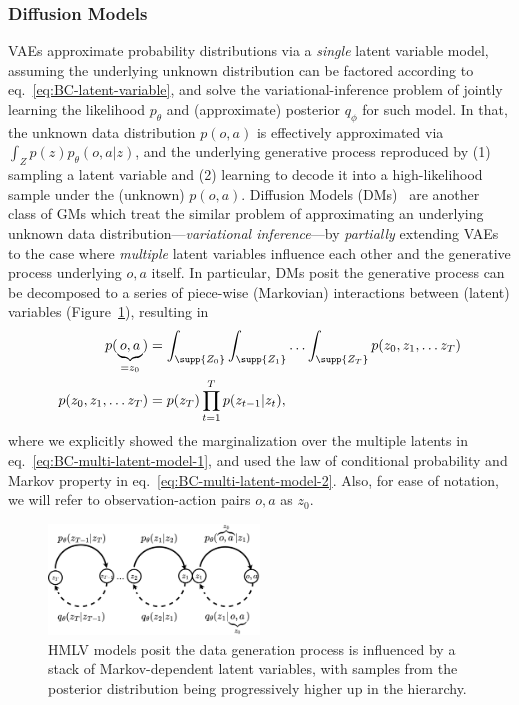 \subsubsection{Diffusion Models}
VAEs approximate probability distributions via a \emph{single} latent variable model, assuming the underlying unknown distribution can be factored according to eq.~\ref{eq:BC-latent-variable}, and solve the variational-inference problem of jointly learning the likelihood \( p_\theta \) and (approximate) posterior \( q_\phi \) for such model.
In that, the unknown data distribution \( p(o,a) \) is effectively approximated via \( \int_Z p(z) p_\theta(o,a \vert z) \), and the underlying generative process reproduced by (1) sampling a latent variable and (2) learning to decode it into a high-likelihood sample under the (unknown) \( p(o,a) \).
Diffusion Models (DMs)~\citep{hoDenoisingDiffusionProbabilistic2020} are another class of GMs which treat the similar problem of approximating an underlying unknown data distribution---\emph{variational inference}---by \emph{partially} extending VAEs to the case where \emph{multiple} latent variables influence each other and the generative process underlying \(o,a\) itself.
In particular, DMs posit the generative process can be decomposed to a series of piece-wise (Markovian) interactions between (latent) variables (Figure~\ref{fig:ch4-many-latents}), resulting in
\begin{align}
    p(\underbrace{o,a}_{= z_0}) &= \int_{\supp{Z_0}} \int_{\supp{Z_1}} \hdots \int_{\supp{Z_T}} p(z_0, z_1, \dots z_T) \label{eq:BC-multi-latent-model-1} \\ 
    p(z_0, z_1, \dots z_T) &= p(z_T) \prod_{t=1}^{T} p(z_{t-1} \vert z_t), \label{eq:BC-multi-latent-model-2}
\end{align}
where we explicitly showed the marginalization over the multiple latents in eq.~\ref{eq:BC-multi-latent-model-1}, and used the law of conditional probability and Markov property in eq.~\ref{eq:BC-multi-latent-model-2}.
Also, for ease of notation, we will refer to observation-action pairs \( o,a \) as \( z_0 \).

\begin{figure}
    \centering
    \includegraphics[width=0.5\textwidth]{figures/ch4/ch4-many-latents.png}
    \caption{HMLV models posit the data generation process is influenced by a stack of Markov-dependent latent variables, with samples from the posterior distribution being progressively higher up in the hierarchy.}
    \label{fig:ch4-many-latents}
\end{figure}

